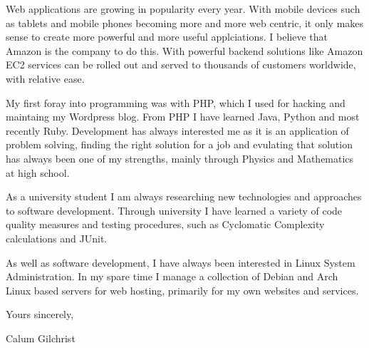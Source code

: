 


\setlength{\parskip}{0.5em}




Web applications are growing in popularity every year. With mobile devices such
as tablets and mobile phones becoming more and more web centric, it only makes
sense to create more powerful and more useful applciations. I believe that
Amazon is the company to do this. With powerful backend solutions like Amazon
EC2 services can be rolled out and served to thousands of customers worldwide,
with relative ease.


My first foray into programming was with PHP, which I used for hacking and
maintaing my Wordpress blog. From PHP I have learned Java, Python and most
recently Ruby. Development has always interested me as it is an application of
problem solving, finding the right solution for a job and evulating that
solution has always been one of my strengths, mainly through Physics and
Mathematics at high school.


As a university student I am always researching new technologies and approaches
to software development. Through university I have learned a variety of code
quality measures and testing procedures, such as Cyclomatic Complexity
calculations and JUnit.

As well as software development, I have always been interested in Linux System
Administration. In my spare time I manage a collection of Debian and Arch Linux
based servers for web hosting, primarily for my own websites and services.

\bigskip
Yours sincerely,


Calum Gilchrist
